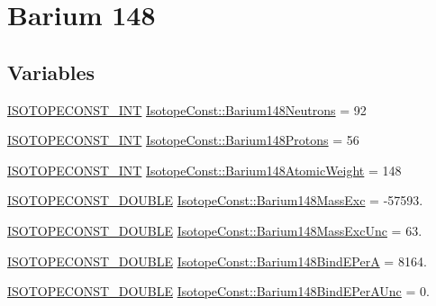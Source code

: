 \hypertarget{group___isotope_const-_barium-_ba148}{}\section{Barium 148}
\label{group___isotope_const-_barium-_ba148}
\subsection*{Variables}
\begin{DoxyCompactItemize}
\item 
\mbox{\hyperlink{group___isotope_const-_macros_ga5f18360b3e99483a35c32d789e62621c}{I\+S\+O\+T\+O\+P\+E\+C\+O\+N\+S\+T\+\_\+\+I\+NT}} \mbox{\hyperlink{group___isotope_const-_barium-_ba148_ga3a0360aed5f29bc0ee9617f67638de3f}{Isotope\+Const\+::\+Barium148\+Neutrons}} = 92
\item 
\mbox{\hyperlink{group___isotope_const-_macros_ga5f18360b3e99483a35c32d789e62621c}{I\+S\+O\+T\+O\+P\+E\+C\+O\+N\+S\+T\+\_\+\+I\+NT}} \mbox{\hyperlink{group___isotope_const-_barium-_ba148_ga39a50a45e4c887066e1b6bb72a2dd9ba}{Isotope\+Const\+::\+Barium148\+Protons}} = 56
\item 
\mbox{\hyperlink{group___isotope_const-_macros_ga5f18360b3e99483a35c32d789e62621c}{I\+S\+O\+T\+O\+P\+E\+C\+O\+N\+S\+T\+\_\+\+I\+NT}} \mbox{\hyperlink{group___isotope_const-_barium-_ba148_ga41c652b0c6d93821a20a52d16bbd4d70}{Isotope\+Const\+::\+Barium148\+Atomic\+Weight}} = 148
\item 
\mbox{\hyperlink{group___isotope_const-_macros_ga8f45a7272ce02c0b4c65c44636ed719a}{I\+S\+O\+T\+O\+P\+E\+C\+O\+N\+S\+T\+\_\+\+D\+O\+U\+B\+LE}} \mbox{\hyperlink{group___isotope_const-_barium-_ba148_ga086eb77bc83099c8ed90e0949d252a52}{Isotope\+Const\+::\+Barium148\+Mass\+Exc}} = -\/57593.
\item 
\mbox{\hyperlink{group___isotope_const-_macros_ga8f45a7272ce02c0b4c65c44636ed719a}{I\+S\+O\+T\+O\+P\+E\+C\+O\+N\+S\+T\+\_\+\+D\+O\+U\+B\+LE}} \mbox{\hyperlink{group___isotope_const-_barium-_ba148_ga0565a6348b884aff998d92b65e8489bf}{Isotope\+Const\+::\+Barium148\+Mass\+Exc\+Unc}} = 63.
\item 
\mbox{\hyperlink{group___isotope_const-_macros_ga8f45a7272ce02c0b4c65c44636ed719a}{I\+S\+O\+T\+O\+P\+E\+C\+O\+N\+S\+T\+\_\+\+D\+O\+U\+B\+LE}} \mbox{\hyperlink{group___isotope_const-_barium-_ba148_ga7c29406ea788fb5f1631b308c4752879}{Isotope\+Const\+::\+Barium148\+Bind\+E\+PerA}} = 8164.
\item 
\mbox{\hyperlink{group___isotope_const-_macros_ga8f45a7272ce02c0b4c65c44636ed719a}{I\+S\+O\+T\+O\+P\+E\+C\+O\+N\+S\+T\+\_\+\+D\+O\+U\+B\+LE}} \mbox{\hyperlink{group___isotope_const-_barium-_ba148_ga250de332be30ca3d73ac571b0db26a70}{Isotope\+Const\+::\+Barium148\+Bind\+E\+Per\+A\+Unc}} = 0.

\end{DoxyCompactItemize}
